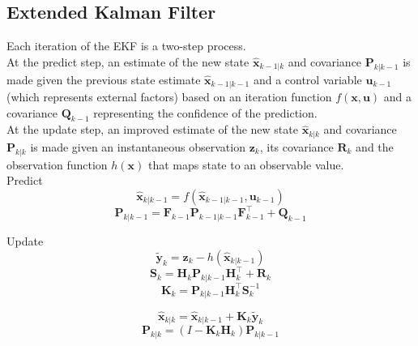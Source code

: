 \documentclass[letterpaper,12pt]{article} %
\begin{document}
\subsection{Extended Kalman Filter}

Each iteration of the EKF is a two-step process.\\

At the predict step, an estimate of the new state $ \hat{\boldsymbol{x}}_{k-1|k} $ and covariance $ \boldsymbol{P}_{k|k-1} $ is made given the previous state estimate $ \hat{\boldsymbol{x}}_{k-1|k-1} $ and a control variable $  \boldsymbol{u}_{k-1} $ (which represents external factors) based on an iteration function $ f(\boldsymbol{x}, \boldsymbol{u}) $ and a covariance $ \boldsymbol{Q}_{k-1} $ representing the confidence of the prediction.\\

At the update step, an improved estimate of the new state $ \hat{\boldsymbol{x}}_{k|k} $ and covariance $ \boldsymbol{P}_{k|k} $ is made given an instantaneous observation $ \boldsymbol{z}_{k} $, its covariance $ \boldsymbol{R}_{k} $ and the observation function $ h(\boldsymbol{x}) $ that maps state to an observable value.\\

Predict
\begin{equation}
\hat{\boldsymbol{x}}_{k|k-1} = f(\hat{\boldsymbol{x}}_{k-1|k-1}, \boldsymbol{u}_{k-1})
\end{equation}
\begin{equation}
\boldsymbol{P}_{k|k-1} =  {\boldsymbol{F}_{k-1}} \boldsymbol{P}_{k-1|k-1}{\boldsymbol{F}_{k-1}^\top} + \boldsymbol{Q}_{k-1}
\end{equation}

Update
\begin{equation}
\tilde{\boldsymbol{y}}_{k} = \boldsymbol{z}_{k} - h(\hat{\boldsymbol{x}}_{k|k-1})
\end{equation}
\begin{equation}
\boldsymbol{S}_{k} = \boldsymbol{H}_{k}\boldsymbol{P}_{k|k-1}\boldsymbol{H}_{k}^\top + \boldsymbol{R}_{k}
\end{equation}
\begin{equation}
\boldsymbol{K}_{k} = \boldsymbol{P}_{k|k-1}\boldsymbol{H}_{k}^\top\boldsymbol{S}_{k}^{-1}
\end{equation}

\begin{equation}
\hat{\boldsymbol{x}}_{k|k} = \hat{\boldsymbol{x}}_{k|k-1} + \boldsymbol{K}_{k}\tilde{\boldsymbol{y}}_{k}
\end{equation}
\begin{equation}
\boldsymbol{P}_{k|k} = (I - \boldsymbol{K}_{k} \boldsymbol{H}_{k}) \boldsymbol{P}_{k|k-1}
\end{equation}\\
\end{document}
